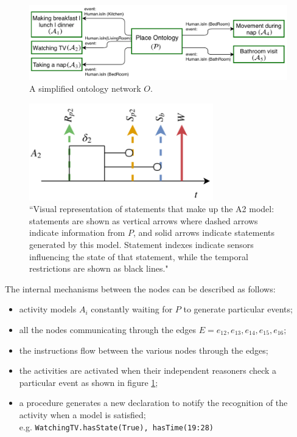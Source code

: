 \documentclass{thesisreport}
\begin{document}
  \begin{figure}[h]
	\centering
	\includegraphics[width=15cm]{Thesis/data/O.png}
	\caption{A simplified ontology network $O$.}
	\label{fig:simplifiedOntologyNetwork}
  \end{figure}
   \begin{figure}[H]
	\centering
	\includegraphics[width=8cm]{Thesis/data/event.png}
	\caption{``Visual representation of statements that make up the A2 model: statements are shown as vertical arrows where dashed arrows indicate information from $P$, and solid arrows indicate statements generated by this model. Statement indexes indicate sensors influencing the state of that statement, while the temporal restrictions are shown as black lines."}
	\label{fig:A2}
 \end{figure}

 The internal mechanisms between the nodes can be described as follows:
 \begin{itemize}
     \item activity models $A_i$ constantly waiting for $P$ to generate particular events;
     \item all the nodes communicating through the edges $E = e_{12}, e_{13}, e_{14}, e_{15}, e_{16}$;
     \item the instructions flow between the various nodes through the edges;
     \item the activities are activated when their independent reasoners check a particular event as shown in figure \ref{fig:simplifiedOntologyNetwork};
     \item a procedure generates a new declaration to notify the recognition of the activity when a model is satisfied;\\
     e.g. \texttt{WatchingTV.{hasState(True), hasTime(19:28)}}
 \end{itemize}
\end{document}
